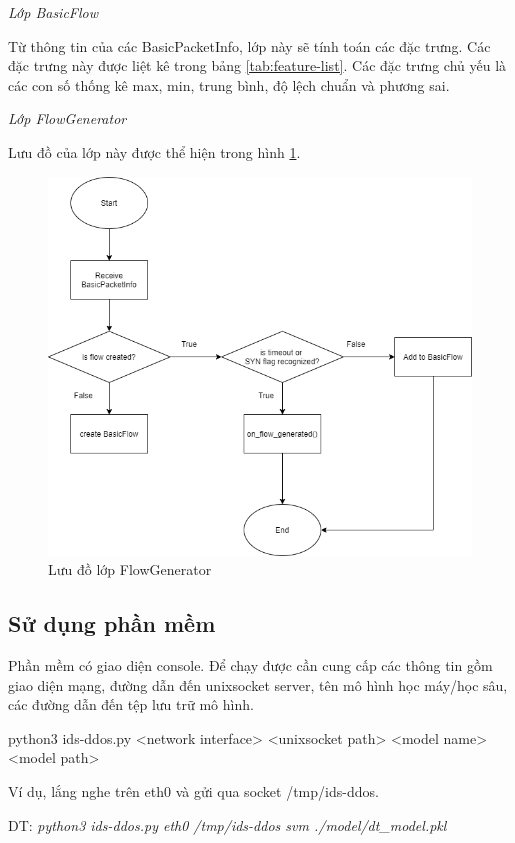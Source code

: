\textit{Lớp BasicFlow}

Từ thông tin của các BasicPacketInfo, lớp này sẽ tính toán các đặc trưng. Các đặc trưng này được liệt kê trong bảng \ref{tab:feature-list}. Các đặc trưng chủ yếu là các con số thống kê max, min, trung bình, độ lệch chuẩn và phương sai.

\textit{Lớp FlowGenerator}

Lưu đồ của lớp này được thể hiện trong hình \ref{fig:flow-gen}.

\begin{figure}[ht!]
	\includegraphics[width=\linewidth]{fig/flow-gen.png}
	\caption{Lưu đồ lớp FlowGenerator}
	\label{fig:flow-gen}
\end{figure}

\subsection{Sử dụng phần mềm}

Phần mềm có giao diện console. Để chạy được cần cung cấp các thông tin gồm giao diện mạng, đường dẫn đến unixsocket server, tên mô hình học máy/học sâu, các đường dẫn đến tệp lưu trữ mô hình.

python3 ids-ddos.py <network interface> <unixsocket path> <model name> <model path>

Ví dụ, lắng nghe trên eth0 và gửi qua socket /tmp/ids-ddos.

DT: \textit{python3 ids-ddos.py eth0 /tmp/ids-ddos svm ./model/dt\_model.pkl}

